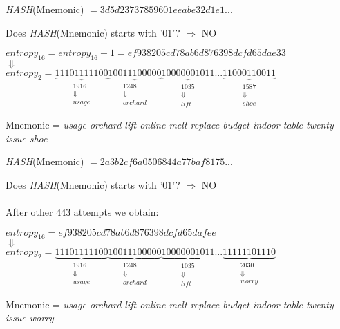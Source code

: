 \begin{center}
	\textit{HASH}(Mnemonic) $= 3d5d23737859601eeabe32d1e1...$
\end{center}
Does \textit{HASH}(Mnemonic) starts with '01'? $\Rightarrow$ NO
\begin{center}
	$entropy_{16} = entropy_{16} + 1  = ef938205cd78ab6d876398dcfd65dae33$
	\\
	$\Downarrow $
	\\
	$entropy_{2}= \underbrace{11101111100}_{\substack{1916 \\ \Downarrow\\ usage} }
	\underbrace{10011100000}_{\substack{1248 \\ \Downarrow\\ orchard}}
	\underbrace{10000001011}_{\substack{1035 \\ \Downarrow\\ lift}}
	...
	\underbrace{11000110011}_{\substack{1587 \\ \Downarrow\\ shoe}}  $
\end{center}
Mnemonic = \textit{usage orchard lift online melt replace budget indoor table twenty issue shoe}

\begin{center}
	\textit{HASH}(Mnemonic) $= 2a3b2cf6a0506844a77baf8175...$
\end{center}
Does \textit{HASH}(Mnemonic) starts with '01'? $\Rightarrow$ NO
\\ \\
After other 443 attempts we obtain:
\begin{center}
	$entropy_{16} =ef938205cd78ab6d876398dcfd65dafee$
	\\
	$\Downarrow $
	\\
	$entropy_{2}= \underbrace{11101111100}_{\substack{1916 \\ \Downarrow\\ usage} }
	\underbrace{10011100000}_{\substack{1248 \\ \Downarrow\\ orchard}}
	\underbrace{10000001011}_{\substack{1035 \\ \Downarrow\\ lift}}
	...
	\underbrace{11111101110}_{\substack{2030 \\ \Downarrow\\ worry}}  $
\end{center}
Mnemonic = \textit{usage orchard lift online melt replace budget indoor table twenty issue worry}

